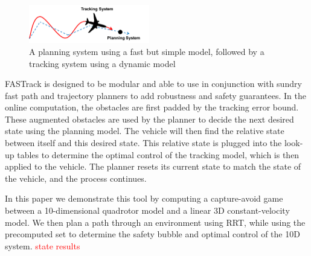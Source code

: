 \begin{figure}
	\centering
	\includegraphics[width=0.47\textwidth]{fig/chasing}
	\caption{A planning system using a fast but simple model, followed by a tracking system using a dynamic model}
	\label{fig:chasing}
\end{figure}

FASTrack is designed to be modular and able to use in conjunction with sundry fast path and trajectory planners to add robustness and safety guarantees. In the online computation, the obstacles are first padded by the tracking error bound. These augmented obstacles are used by the planner to decide the next desired state using the planning model. The vehicle will then find the relative state between itself and this desired state. This relative state is plugged into the look-up tables to determine the optimal control of the tracking model, which is then applied to the vehicle. The planner resets its current state to match the state of the vehicle, and the process continues.

In this paper we demonstrate this tool by computing a capture-avoid game between a 10-dimensional quadrotor model and a linear 3D constant-velocity model. We then plan a path through an environment using RRT, while using the precomputed set to determine the safety bubble and optimal control of the 10D system. \textcolor{red}{state results}
